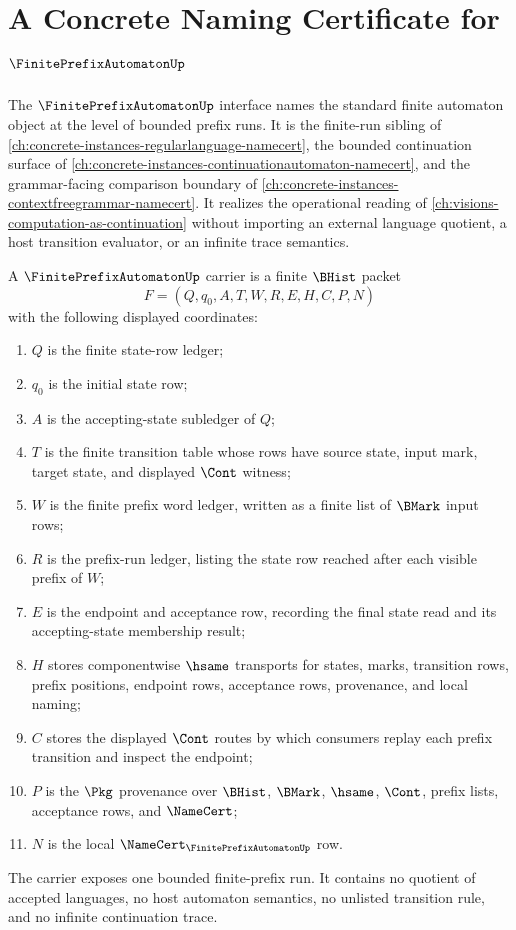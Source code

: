 \chapter{A Concrete Naming Certificate for $\FinitePrefixAutomatonUp$}
\label{ch:concrete-instances-finiteprefixautomaton-namecert}

The $\FinitePrefixAutomatonUp$ interface names the standard finite automaton object at the level of bounded prefix runs. It is the finite-run sibling of \autoref{ch:concrete-instances-regularlanguage-namecert}, the bounded continuation surface of \autoref{ch:concrete-instances-continuationautomaton-namecert}, and the grammar-facing comparison boundary of \autoref{ch:concrete-instances-contextfreegrammar-namecert}. It realizes the operational reading of \autoref{ch:visions-computation-as-continuation} without importing an external language quotient, a host transition evaluator, or an infinite trace semantics.

\begin{definition}
\label{def:finiteprefixautomaton-carrier}
A $\FinitePrefixAutomatonUp$ carrier is a finite $\BHist$ packet
$$
F=(Q,q_0,A,T,W,R,E,H,C,P,N)
$$
with the following displayed coordinates:
\begin{enumerate}
\item $Q$ is the finite state-row ledger;
\item $q_0$ is the initial state row;
\item $A$ is the accepting-state subledger of $Q$;
\item $T$ is the finite transition table whose rows have source state, input mark, target state, and displayed $\Cont$ witness;
\item $W$ is the finite prefix word ledger, written as a finite list of $\BMark$ input rows;
\item $R$ is the prefix-run ledger, listing the state row reached after each visible prefix of $W$;
\item $E$ is the endpoint and acceptance row, recording the final state read and its accepting-state membership result;
\item $H$ stores componentwise $\hsame$ transports for states, marks, transition rows, prefix positions, endpoint rows, acceptance rows, provenance, and local naming;
\item $C$ stores the displayed $\Cont$ routes by which consumers replay each prefix transition and inspect the endpoint;
\item $P$ is the $\Pkg$ provenance over $\BHist$, $\BMark$, $\hsame$, $\Cont$, prefix lists, acceptance rows, and $\NameCert$;
\item $N$ is the local $\NameCert_{\FinitePrefixAutomatonUp}$ row.
\end{enumerate}
The carrier exposes one bounded finite-prefix run. It contains no quotient of accepted languages, no host automaton semantics, no unlisted transition rule, and no infinite continuation trace.
\end{definition}

